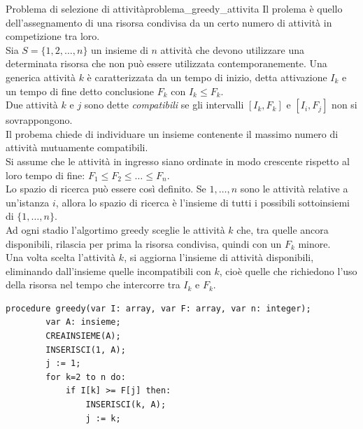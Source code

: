 \documentclass[12pt]{report}
\newcommand{\nmu}{}
\begin{document}
 \begin{example}{\nmu Problema di selezione di attività}{problema_greedy_attivita}
 	Il prolema è quello dell'assegnamento di una risorsa condivisa da un certo numero di attività in competizione tra loro. \\
 	Sia $S = \{1, 2, \dots, n\}$ un insieme di $n$ attività che devono utilizzare una determinata risorsa che non può essere utilizzata contemporanemente. Una generica attività $k$ è caratterizzata da un tempo di inizio, detta attivazione $I_k$ e un tempo di fine detto conclusione $F_k$ con $I_k \leq F_k$. \\
 	Due attività $k$ e $j$ sono dette \textit{compatibili} se gli intervalli $[I_k, F_k]$ e $[I_i, F_j]$ non si sovrappongono. \\
 	Il probema chiede di individuare un insieme contenente il massimo numero di attività mutuamente compatibili. \\
 	Si assume che le attività in ingresso siano ordinate in modo crescente rispetto al loro tempo di fine: $F_1 \leq F_2 \leq \dots \leq F_n$. \\
 	Lo spazio di ricerca può essere così definito. Se $1, \dots, n$ sono le attività relative a un'istanza $i$, allora lo spazio di ricerca  è l'insieme di tutti i possibili sottoinsiemi di $\{1, \dots, n\}$. \\
 	Ad ogni stadio l'algortimo greedy sceglie le attività $k$ che, tra quelle ancora disponibili, rilascia per prima la risorsa condivisa, quindi con un $F_k$ minore. \\
 	Una volta scelta l'attività $k$, si aggiorna l'insieme di attività disponibili, eliminando dall'insieme quelle incompatibili con $k$, cioè quelle che richiedono l'uso della risorsa nel tempo che intercorre tra $I_k$ e $F_k$.
 	\begin{lstlisting}[style=pascalstyle]
 		procedure greedy(var I: array, var F: array, var n: integer);
 		var A: insieme;
 		CREAINSIEME(A);
 		INSERISCI(1, A);
 		j := 1;
 		for k=2 to n do:
 			if I[k] >= F[j] then:
 				INSERISCI(k, A);
 				j := k;
 	\end{lstlisting}
 \end{example}
\end{document}
